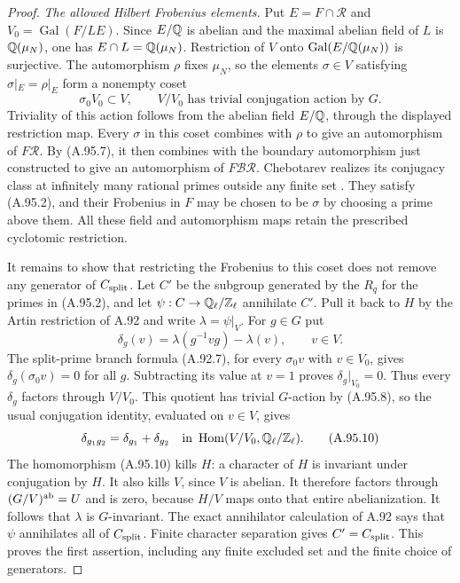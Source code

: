 \begin{proof}
\emph{The allowed Hilbert Frobenius elements.}
Put $E=F\cap\mathcal R$ and
$V_0=\operatorname{Gal}(F/LE)$.
Since $E/\mathbb Q$ is abelian and the maximal abelian field of
$L$ is $\mathbb Q(\mu_N)$, one has
$E\cap L=\mathbb Q(\mu_N)$.
Restriction of $V$ onto
$\operatorname{Gal}(E/\mathbb Q(\mu_N))$ is surjective.
The automorphism $\rho$ fixes $\mu_N$, so the elements
$\sigma\in V$ satisfying $\sigma|_E=\rho|_E$ form a
nonempty coset
\[
        \sigma_0V_0\subset V,
       \qquad V/V_0\text{ has trivial conjugation action by }G.
 \tag{A.95.8}
\]
Triviality of this action follows from the abelian field
$E/\mathbb Q$, through the displayed restriction map.
Every $\sigma$ in this coset combines with $\rho$ to give
an automorphism of $F\mathcal R$.
By (A.95.7), it then combines with the boundary automorphism
just constructed to give an automorphism of
$F\mathcal B\mathcal R$.
Chebotarev realizes its conjugacy class at infinitely many
rational primes outside any finite set
\cite[Theorem 8.31]{AgentMilneANT}.
They satisfy (A.95.2), and their Frobenius in $F$ may be
chosen to be $\sigma$ by choosing a prime above them.
All these field and automorphism maps retain the prescribed
cyclotomic restriction.

It remains to show that restricting the Frobenius to this
coset does not remove any generator of $C_{\rm split}$.
Let $C'$ be the subgroup generated by the $R_q$ for the
primes in (A.95.2), and let
$\psi:C\to\mathbb Q_\ell/\mathbb Z_\ell$ annihilate $C'$.
Pull it back to $H$ by the Artin restriction of A.92 and
write $\lambda=\psi|_V$.
For $g\in G$ put
\[
 \delta_g(v)=\lambda(g^{-1}vg)-\lambda(v),\qquad v\in V.
 \tag{A.95.9}
\]
The split-prime branch formula (A.92.7), for every
$\sigma_0v$ with $v\in V_0$, gives
$\delta_g(\sigma_0v)=0$ for all $g$.
Subtracting its value at $v=1$ proves
$\delta_g|_{V_0}=0$.
Thus every $\delta_g$ factors through $V/V_0$.
This quotient has trivial $G$-action by (A.95.8), so the
usual conjugation identity, evaluated on $v\in V$, gives
\[
  \delta_{g_1g_2}=\delta_{g_1}+\delta_{g_2}
       \quad\text{in }\operatorname{Hom}
              (V/V_0,\mathbb Q_\ell/\mathbb Z_\ell).
 \tag{A.95.10}
\]
The homomorphism (A.95.10) kills $H$: a character of $H$
is invariant under conjugation by $H$.
It also kills $V$, since $V$ is abelian.
It therefore factors through $(G/V)^{\rm ab}=U$ and is
zero, because $H/V$ maps onto that entire abelianization.
It follows that $\lambda$ is $G$-invariant.
The exact annihilator calculation of A.92 says that
$\psi$ annihilates all of $C_{\rm split}$.
Finite character separation gives $C'=C_{\rm split}$.
This proves the first assertion, including any finite
excluded set and the finite choice of generators.


\end{proof}
